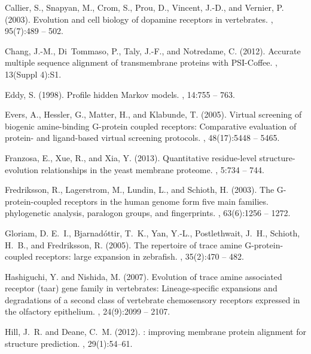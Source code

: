 \documentclass[fleqn,10pt]{wlpeerj}
\begin{document}
\begin{thebibliography}{}
Callier, S., Snapyan, M., Crom, S., Prou, D., Vincent, J.-D., and Vernier, P.
  (2003).
\newblock Evolution and cell biology of dopamine receptors in vertebrates.
, 95(7):489 -- 502.

Chang, J.-M., Di~Tommaso, P., Taly, J.-F., and Notredame, C. (2012).
\newblock Accurate multiple sequence alignment of transmembrane proteins with
  {PSI-Coffee}.
, 13(Suppl 4):S1.

Eddy, S. (1998).
\newblock Profile hidden {Markov} models.
, 14:755 -- 763.

Evers, A., Hessler, G., Matter, H., and Klabunde, T. (2005).
\newblock Virtual screening of biogenic amine-binding {G}-protein coupled
  receptors: Comparative evaluation of protein- and ligand-based virtual
  screening protocols.
, 48(17):5448 -- 5465.

Franzosa, E., Xue, R., and Xia, Y. (2013).
\newblock Quantitative residue-level structure-evolution relationships in the
  yeast membrane proteome.
, 5:734 -- 744.

Fredriksson, R., Lagerstrom, M., Lundin, L., and Schioth, H. (2003).
\newblock The {G}-protein-coupled receptors in the human genome form five main
  families. phylogenetic analysis, paralogon groups, and fingerprints.
, 63(6):1256 -- 1272.

Gloriam, D. E.~I., Bjarnad{\'o}ttir, T.~K., Yan, Y.-L., Postlethwait, J.~H.,
  Schioth, H.~B., and Fredriksson, R. (2005).
\newblock The repertoire of trace amine {G}-protein-coupled receptors: large
  expansion in zebrafish.
, 35(2):470 -- 482.

Hashiguchi, Y. and Nishida, M. (2007).
\newblock Evolution of trace amine associated receptor (taar) gene family in
  vertebrates: Lineage-specific expansions and degradations of a second class
  of vertebrate chemosensory receptors expressed in the olfactory epithelium.
, 24(9):2099 -- 2107.

Hill, J.~R. and Deane, C.~M. (2012).
: improving membrane protein alignment for structure
  prediction.
, 29(1):54--61.


\end{thebibliography}
\end{document}
